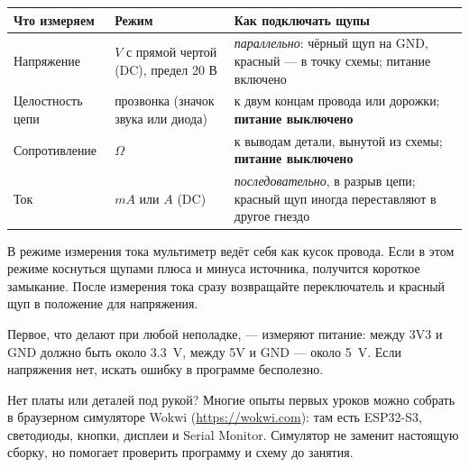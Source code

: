 \begin{center}\small
\begin{tabularx}{\textwidth}{@{}l l X@{}}
\toprule
Что измеряем & Режим & Как подключать щупы \\
\midrule
Напряжение & $V$ с прямой чертой (DC), предел 20 В & \emph{параллельно}: чёрный щуп на GND, красный --- в точку схемы; питание включено \\
Целостность цепи & прозвонка (значок звука или диода) & к двум концам провода или дорожки; \textbf{питание выключено} \\
Сопротивление & $\Omega$ & к выводам детали, вынутой из схемы; \textbf{питание выключено} \\
Ток & $mA$ или $A$ (DC) & \emph{последовательно}, в разрыв цепи; красный щуп иногда переставляют в другое гнездо \\
\bottomrule
\end{tabularx}
\end{center}

\begin{caution}
В режиме измерения тока мультиметр ведёт себя как кусок провода. Если в этом режиме коснуться щупами
плюса и минуса источника, получится короткое замыкание. После измерения тока сразу возвращайте
переключатель и красный щуп в положение для напряжения.
\end{caution}

Первое, что делают при любой неполадке, --- измеряют питание: между 3V3 и GND должно быть около
\SI{3.3}{V}, между 5V и GND --- около \SI{5}{V}. Если напряжения нет, искать ошибку в программе бесполезно.

\begin{tip}
Нет платы или деталей под рукой? Многие опыты первых уроков можно собрать в браузерном симуляторе
Wokwi (\url{https://wokwi.com}): там есть ESP32-S3, светодиоды, кнопки, дисплеи и Serial Monitor.
Симулятор не заменит настоящую сборку, но помогает проверить программу и схему до занятия.
\end{tip}

